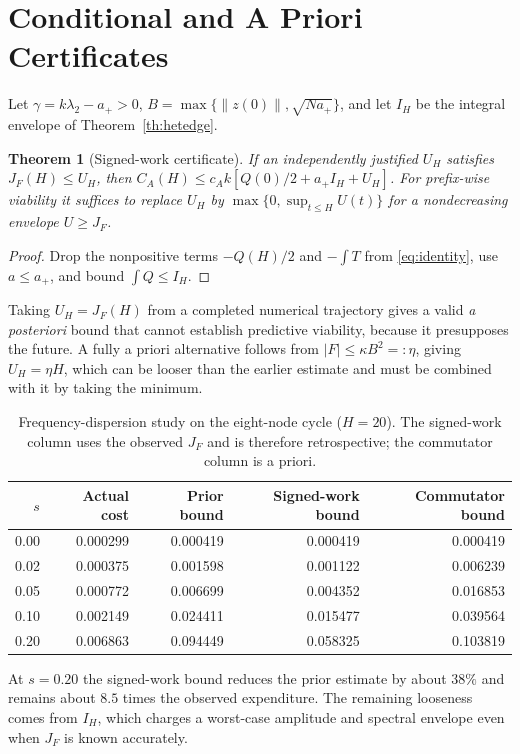 \documentclass[11pt,notitlepage]{report}
\newtheorem{theorem}{Theorem}[chapter]
\theoremstyle{definition}
\theoremstyle{remark}
\begin{document}
\section{Conditional and A Priori Certificates}
Let $\gamma=k\lambda_2-a_+>0$, $B=\max\{\|z(0)\|,\sqrt{Na_+}\}$, and let $I_H$ be the integral envelope of Theorem~\ref{th:hetedge}.
\begin{theorem}[Signed-work certificate]\label{th:signedwork}
If an independently justified $U_H$ satisfies $J_F(H)\le U_H$, then $C_A(H)\le c_Ak[Q(0)/2+a_+I_H+U_H]$. For prefix-wise viability it suffices to replace $U_H$ by $\max\{0,\sup_{t\le H}U(t)\}$ for a nondecreasing envelope $U\ge J_F$.
\end{theorem}
\begin{proof}
Drop the nonpositive terms $-Q(H)/2$ and $-\int T$ from \eqref{eq:identity}, use $a\le a_+$, and bound $\int Q\le I_H$.
\end{proof}
Taking $U_H=J_F(H)$ from a completed numerical trajectory gives a valid \emph{a posteriori} bound that cannot establish predictive viability, because it presupposes the future. A fully a priori alternative follows from $|F|\le\kappa B^2=:\eta$, giving $U_H=\eta H$, which can be looser than the earlier estimate and must be combined with it by taking the minimum.
\begin{table}[ht]\centering\small
\caption{Frequency-dispersion study on the eight-node cycle ($H=20$). The signed-work column uses the observed $J_F$ and is therefore retrospective; the commutator column is a priori.}
\begin{tabular}{rrrrr}\toprule
$s$&Actual cost&Prior bound&Signed-work bound&Commutator bound\\\midrule
0.00&0.000299&0.000419&0.000419&0.000419\\
0.02&0.000375&0.001598&0.001122&0.006239\\
0.05&0.000772&0.006699&0.004352&0.016853\\
0.10&0.002149&0.024411&0.015477&0.039564\\
0.20&0.006863&0.094449&0.058325&0.103819\\\bottomrule
\end{tabular}
\end{table}
At $s=0.20$ the signed-work bound reduces the prior estimate by about $38\%$ and remains about $8.5$ times the observed expenditure. The remaining looseness comes from $I_H$, which charges a worst-case amplitude and spectral envelope even when $J_F$ is known accurately.
\end{document}
